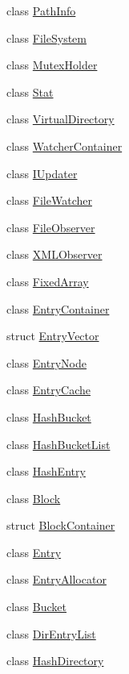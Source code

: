\begin{DoxyCompactItemize}
\item 
class \hyperlink{classmocha_1_1_path_info}{PathInfo}
\item 
class \hyperlink{classmocha_1_1_file_system}{FileSystem}
\item 
class \hyperlink{classmocha_1_1_mutex_holder}{MutexHolder}
\item 
class \hyperlink{classmocha_1_1_stat}{Stat}
\item 
class \hyperlink{classmocha_1_1_virtual_directory}{VirtualDirectory}
\item 
class \hyperlink{classmocha_1_1_watcher_container}{WatcherContainer}
\item 
class \hyperlink{classmocha_1_1_i_updater}{IUpdater}
\item 
class \hyperlink{classmocha_1_1_file_watcher}{FileWatcher}
\item 
class \hyperlink{classmocha_1_1_file_observer}{FileObserver}
\item 
class \hyperlink{classmocha_1_1_x_m_l_observer}{XMLObserver}
\item 
class \hyperlink{classmocha_1_1_fixed_array}{FixedArray}
\item 
class \hyperlink{classmocha_1_1_entry_container}{EntryContainer}
\item 
struct \hyperlink{structmocha_1_1_entry_vector}{EntryVector}
\item 
class \hyperlink{classmocha_1_1_entry_node}{EntryNode}
\item 
class \hyperlink{classmocha_1_1_entry_cache}{EntryCache}
\item 
class \hyperlink{classmocha_1_1_hash_bucket}{HashBucket}
\item 
class \hyperlink{classmocha_1_1_hash_bucket_list}{HashBucketList}
\item 
class \hyperlink{classmocha_1_1_hash_entry}{HashEntry}
\item 
class \hyperlink{classmocha_1_1_block}{Block}
\item 
struct \hyperlink{structmocha_1_1_block_container}{BlockContainer}
\item 
class \hyperlink{classmocha_1_1_entry}{Entry}
\item 
class \hyperlink{classmocha_1_1_entry_allocator}{EntryAllocator}
\item 
class \hyperlink{classmocha_1_1_bucket}{Bucket}
\item 
class \hyperlink{classmocha_1_1_dir_entry_list}{DirEntryList}
\item 
class \hyperlink{classmocha_1_1_hash_directory}{HashDirectory}

\end{DoxyCompactItemize}
